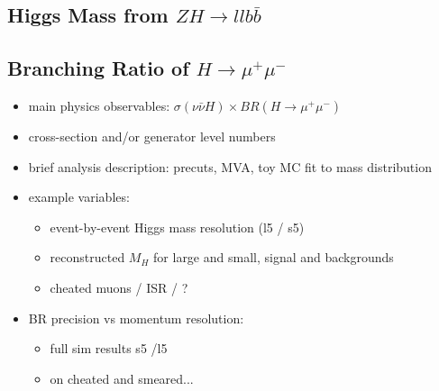 \subsection{Higgs Mass from $ZH \to ll b\bar{b}$}
\subsection{Branching Ratio of $H \to \mu^+\mu^-$}
\begin{itemize}
\item main physics observables: $\sigma(\nu\bar{\nu} H)\times BR(H\to \mu^+\mu^-)$
\item cross-section and/or generator level numbers  
\item brief analysis description: precuts, MVA, toy MC fit to mass distribution
\item example variables: 
  \begin{itemize}
     \item event-by-event Higgs mass resolution (l5 / s5)
     \item reconstructed $M_H$ for large and small, signal and backgrounds
   
     \item cheated muons / ISR / ?
  \end{itemize}
\item BR precision vs momentum resolution: 
  \begin{itemize}
     \item full sim results s5 /l5
     \item on cheated and smeared...
  \end{itemize}
\end{itemize}

